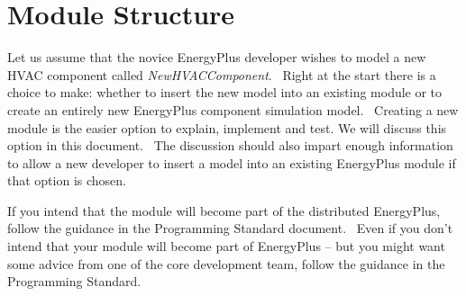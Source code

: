 \chapter{Module Structure}\label{module-structure}

Let us assume that the novice EnergyPlus developer wishes to model a new HVAC component called \emph{NewHVACComponent}.~ Right at the start there is a choice to make: whether to insert the new model into an existing module or to create an entirely new EnergyPlus component simulation model.~ Creating a new module is the easier option to explain, implement and test. We will discuss this option in this document.~ The discussion should also impart enough information to allow a new developer to insert a model into an existing EnergyPlus module if that option is chosen.

If you intend that the module will become part of the distributed EnergyPlus, follow the guidance in the Programming Standard document.~ Even if you don't intend that your module will become part of EnergyPlus -- but you might want some advice from one of the core development team, follow the guidance in the Programming Standard.
